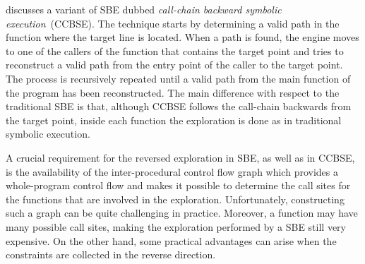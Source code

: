 \cite{MPF-SAS11} discusses a variant of SBE dubbed {\em call-chain backward symbolic execution}~(CCBSE). The technique starts by determining a valid path in the function where the target line is located. When a path is found, the engine moves to one of the callers of the function that contains the target point and tries to reconstruct a valid path from the entry point of the caller to the target point. The process is recursively repeated until a valid path from the main function of the program has been reconstructed. The main difference with respect to the traditional SBE is that, although CCBSE follows the call-chain backwards from the target point, inside each function the exploration is done as in traditional symbolic execution.


A crucial requirement for the reversed exploration in SBE, as well as in CCBSE, is the availability of the inter-procedural control flow graph which provides a whole-program control flow and makes it possible to determine the call sites for the functions that are involved in the exploration. Unfortunately, constructing such a graph can be quite challenging in practice. Moreover, a function may have many possible call sites, making the exploration performed by a SBE still very expensive. On the other hand, some practical advantages can arise when the constraints are collected in the reverse direction.



